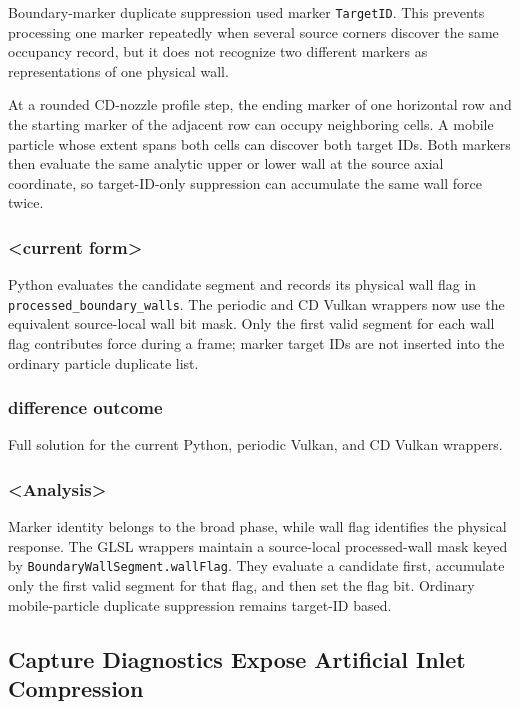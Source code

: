 Boundary-marker duplicate suppression used marker \texttt{TargetID}.  This
prevents processing one marker repeatedly when several source corners discover
the same occupancy record, but it does not recognize two different markers as
representations of one physical wall.

At a rounded CD-nozzle profile step, the ending marker of one horizontal row
and the starting marker of the adjacent row can occupy neighboring cells.  A
mobile particle whose extent spans both cells can discover both target IDs.
Both markers then evaluate the same analytic upper or lower wall at the source
axial coordinate, so target-ID-only suppression can accumulate the same wall
force twice.

\subsubsection{<current form>}

Python evaluates the candidate segment and records its physical wall flag in
\texttt{processed\_boundary\_walls}.  The periodic and CD Vulkan wrappers now
use the equivalent source-local wall bit mask.  Only the first valid segment
for each wall flag contributes force during a frame; marker target IDs are not
inserted into the ordinary particle duplicate list.

\subsubsection{difference outcome}

Full solution for the current Python, periodic Vulkan, and CD Vulkan wrappers.

\subsubsection{<Analysis>}

Marker identity belongs to the broad phase, while wall flag identifies the
physical response.  The GLSL wrappers maintain a source-local processed-wall
mask keyed by \texttt{BoundaryWallSegment.wallFlag}.  They evaluate a candidate
first, accumulate only the first valid segment for that flag, and then set the
flag bit.  Ordinary mobile-particle duplicate suppression remains target-ID
based.

\subsection{Capture Diagnostics Expose Artificial Inlet Compression}

